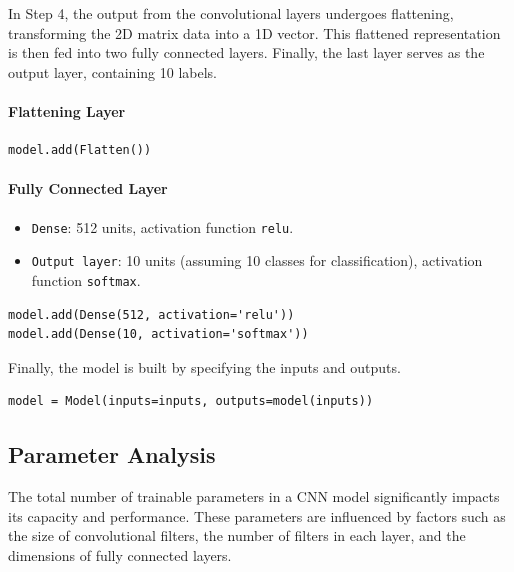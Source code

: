 \begin{step}
In Step 4, the output from the convolutional layers undergoes flattening, transforming the 2D matrix data into a 1D vector. This flattened representation is then fed into two fully connected layers. Finally, the last layer serves as the output layer, containing 10 labels.

\paragraph*{Flattening Layer} 
\begin{verbatim}
model.add(Flatten())
\end{verbatim}

\paragraph*{Fully Connected Layer}
\begin{itemize}
    \item \texttt{Dense}: 512 units, activation function \texttt{relu}.
    \item \texttt{Output layer}: 10 units (assuming 10 classes for classification), activation function \texttt{softmax}.
\end{itemize}
\begin{verbatim}
model.add(Dense(512, activation='relu'))
model.add(Dense(10, activation='softmax'))
\end{verbatim}
\end{step}

\begin{step}
Finally, the model is built by specifying the inputs and outputs.
\begin{verbatim}
model = Model(inputs=inputs, outputs=model(inputs))
\end{verbatim}
\end{step}

\subsection{Parameter Analysis}
The total number of trainable parameters in a CNN model significantly impacts its capacity and performance. These parameters are influenced by factors such as the size of convolutional filters, the number of filters in each layer, and the dimensions of fully connected layers.


